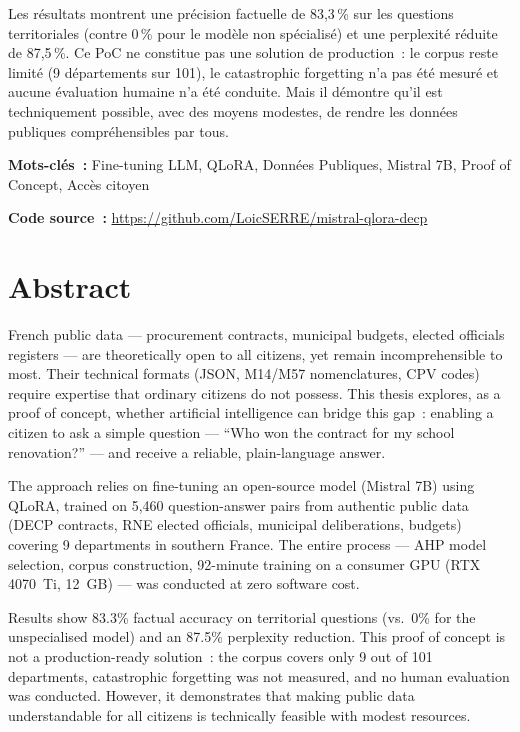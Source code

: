 \documentclass[12pt,a4paper,twoside]{report}
\begin{document}
Les résultats montrent une précision factuelle de 83,3\,\% sur les questions territoriales (contre 0\,\% pour le modèle non spécialisé) et une perplexité réduite de 87,5\,\%. Ce PoC ne constitue pas une solution de production~: le corpus reste limité (9 départements sur 101), le catastrophic forgetting n'a pas été mesuré et aucune évaluation humaine n'a été conduite. Mais il démontre qu'il est techniquement possible, avec des moyens modestes, de rendre les données publiques compréhensibles par tous.

\textbf{Mots-clés~:} Fine-tuning LLM, QLoRA, Données Publiques, Mistral 7B, Proof of Concept, Accès citoyen

\medskip
\noindent\textbf{Code source~:} \url{https://github.com/LoicSERRE/mistral-qlora-decp}

\chapter*{Abstract}

French public data --- procurement contracts, municipal budgets, elected officials registers --- are theoretically open to all citizens, yet remain incomprehensible to most. Their technical formats (JSON, M14/M57 nomenclatures, CPV codes) require expertise that ordinary citizens do not possess. This thesis explores, as a proof of concept, whether artificial intelligence can bridge this gap~: enabling a citizen to ask a simple question --- ``Who won the contract for my school renovation?'' --- and receive a reliable, plain-language answer.

The approach relies on fine-tuning an open-source model (Mistral 7B) using QLoRA, trained on 5,460 question-answer pairs from authentic public data (DECP contracts, RNE elected officials, municipal deliberations, budgets) covering 9 departments in southern France. The entire process --- AHP model selection, corpus construction, 92-minute training on a consumer GPU (RTX 4070~Ti, 12~GB) --- was conducted at zero software cost.

Results show 83.3\% factual accuracy on territorial questions (vs.\ 0\% for the unspecialised model) and an 87.5\% perplexity reduction. This proof of concept is not a production-ready solution~: the corpus covers only 9 out of 101 departments, catastrophic forgetting was not measured, and no human evaluation was conducted. However, it demonstrates that making public data understandable for all citizens is technically feasible with modest resources.
\end{document}

